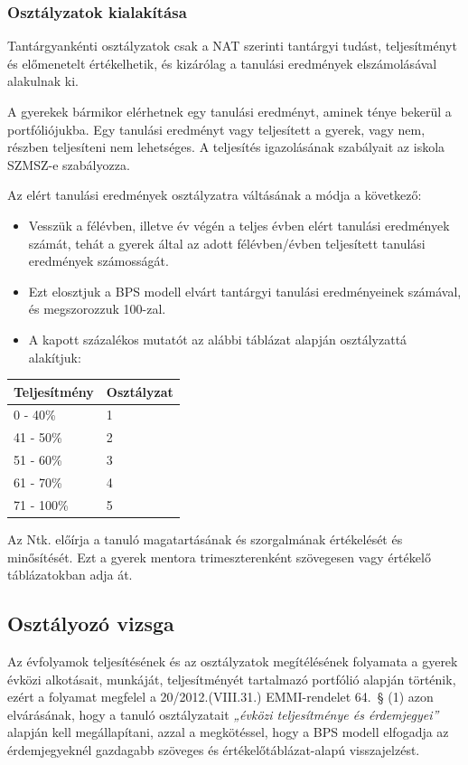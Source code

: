 \hypertarget{osztalyzatok-kialakitasa}{%
\subsubsection{Osztályzatok
kialakítása}\label{osztalyzatok-kialakitasa}}

Tantárgyankénti osztályzatok csak a NAT szerinti tantárgyi tudást,
teljesítményt és előmenetelt értékelhetik, és kizárólag a tanulási
eredmények elszámolásával alakulnak ki.

A gyerekek bármikor elérhetnek egy tanulási eredményt, aminek ténye
bekerül a portfóliójukba. Egy tanulási eredményt vagy teljesített a
gyerek, vagy nem, részben teljesíteni nem lehetséges. A teljesítés
igazolásának szabályait az iskola SZMSZ-e szabályozza.

Az elért tanulási eredmények osztályzatra váltásának a módja a
következő:

\begin{itemize}
\tightlist
\item
  Vesszük a félévben, illetve év végén a teljes évben elért tanulási
  eredmények számát, tehát a gyerek által az adott félévben\slash évben
  teljesített tanulási eredmények számosságát.
\item
  Ezt elosztjuk a BPS modell elvárt tantárgyi tanulási eredményeinek
  számával, és megszorozzuk 100-zal.
\item
  A kapott százalékos mutatót az alábbi táblázat alapján osztályzattá
  alakítjuk:
\end{itemize}

\begin{longtable}[]{@{}ll@{}}
\bfseries Teljesítmény &\bfseries Osztályzat\tabularnewline
\midrule
\endhead
0 - 40\% & 1\tabularnewline
41 - 50\% & 2\tabularnewline
51 - 60\% & 3\tabularnewline
61 - 70\% & 4\tabularnewline
71 - 100\% & 5\tabularnewline
\bottomrule
\end{longtable}

Az Ntk. előírja a tanuló magatartásának és szorgalmának
értékelését és minősítését. Ezt a gyerek mentora trimeszterenként
szövegesen vagy értékelő táblázatokban adja át.

\hypertarget{osztalyozo-vizsga}{%
\subsection{Osztályozó vizsga}\label{osztalyozo-vizsga}}

Az évfolyamok teljesítésének és az osztályzatok megítélésének folyamata a
gyerek évközi alkotásait, munkáját, teljesítményét tartalmazó
portfólió alapján történik, ezért a folyamat megfelel a
20/2012.(VIII.31.) EMMI-rendelet 64.~§ (1) azon elvárásának, hogy a
tanuló osztályzatait \emph{„évközi teljesítménye és érdemjegyei''}
alapján kell megállapítani, azzal a megkötéssel, hogy a BPS modell
elfogadja az érdemjegyeknél gazdagabb szöveges és értékelőtáblázat-alapú
visszajelzést.

